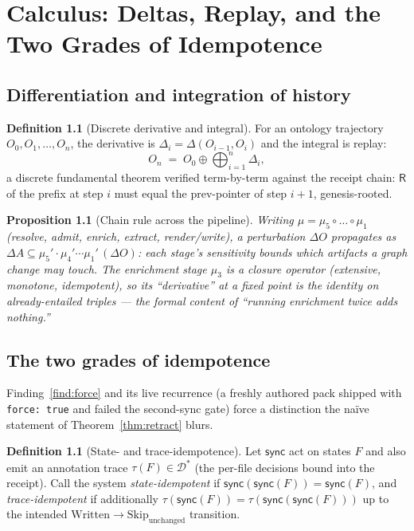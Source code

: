 \documentclass[11pt,a4paper]{report}
\newtheorem{proposition}[theorem]{Proposition}
\theoremstyle{definition}
\newtheorem{definition}[theorem]{Definition}
\theoremstyle{remark}
\newcommand{\sync}{\mathsf{sync}}
\newcommand{\Out}{\mathcal{D}}
\newcommand{\rec}{\mathsf{R}}
\newcommand{\mymu}{\mu}
\newcommand{\del}{\Delta}
\begin{document}
\chapter{Calculus: Deltas, Replay, and the Two Grades of Idempotence}

\section{Differentiation and integration of history}

\begin{definition}[Discrete derivative and integral]
For an ontology trajectory $O_0, O_1, \dots, O_n$, the derivative is
$\del_i = \del(O_{i-1}, O_i)$ and the integral is replay:
\[
  O_n \;=\; O_0 \oplus \bigoplus_{i=1}^{n} \del_i ,
\]
a discrete fundamental theorem verified term-by-term against the receipt
chain: $\rec$ of the prefix at step $i$ must equal the
$\mathrm{prev}$-pointer of step $i+1$, genesis-rooted.
\end{definition}

\begin{proposition}[Chain rule across the pipeline]
Writing $\mymu = \mymu_5 \circ \dots \circ \mymu_1$ (resolve, admit, enrich,
extract, render/write), a perturbation $\del O$ propagates as
$\del A \subseteq \mymu_5'\!\cdot\!\mymu_4'\!\cdots\mymu_1'\,(\del O)$:
each stage's sensitivity bounds which artifacts a graph change may touch.
The enrichment stage $\mymu_3$ is a closure operator
(extensive, monotone, idempotent), so its ``derivative'' at a fixed point is
the identity on already-entailed triples --- the formal content of
``running enrichment twice adds nothing.''
\end{proposition}

\section{The two grades of idempotence}

Finding~\ref{find:force} and its live recurrence (a freshly authored pack
shipped with \texttt{force:\,true} and failed the second-sync gate) force a
distinction the na\"ive statement of Theorem~\ref{thm:retract} blurs.

\begin{definition}[State- and trace-idempotence]
Let $\sync$ act on states $F$ and also emit an annotation trace
$\tau(F) \in \Out^{*}$ (the per-file decisions bound into the receipt).
Call the system \emph{state-idempotent} if $\sync(\sync(F)) = \sync(F)$,
and \emph{trace-idempotent} if additionally
$\tau(\sync(F)) = \tau(\sync(\sync(F)))$ up to the intended
$\mathrm{Written} \to \mathrm{Skip}_{\mathrm{unchanged}}$ transition.
\end{definition}
\end{document}
